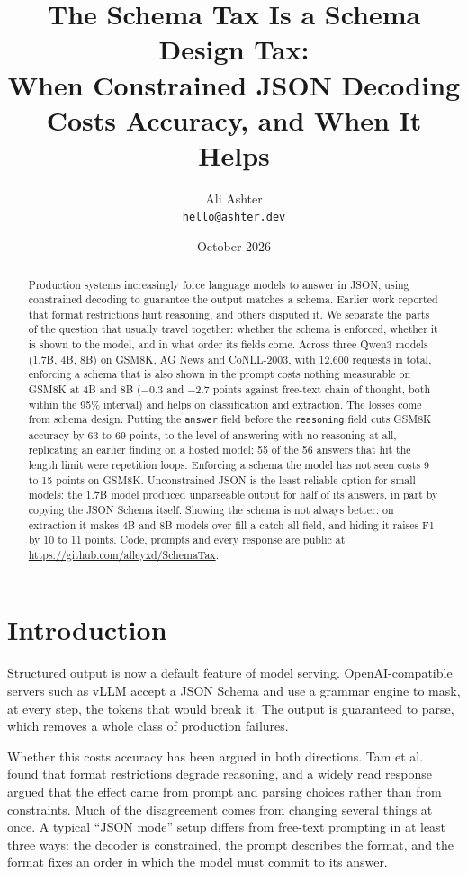 \documentclass[10pt,twocolumn]{article}
\title{The Schema Tax Is a Schema Design Tax:\\When Constrained JSON Decoding Costs Accuracy, and When It Helps}
\author{Ali Ashter\\\texttt{hello@ashter.dev}}
\date{October 2026}
\begin{document}
\maketitle

\begin{abstract}
Production systems increasingly force language models to answer in JSON, using constrained decoding to guarantee the
output matches a schema. Earlier work reported that format restrictions hurt reasoning, and others disputed it. We
separate the parts of the question that usually travel together: whether the schema is enforced, whether it is shown
to the model, and in what order its fields come. Across three Qwen3 models (1.7B, 4B, 8B) on GSM8K, AG News and
CoNLL-2003, with 12,600 requests in total, enforcing a schema that is also shown in the prompt costs nothing
measurable on GSM8K at 4B and 8B ($-0.3$ and $-2.7$ points against free-text chain of thought, both within the 95\%
interval) and helps on classification and extraction. The losses come from schema design. Putting the
\texttt{answer} field before the \texttt{reasoning} field cuts GSM8K accuracy by 63 to 69 points, to the level of
answering with no reasoning at all, replicating an earlier finding on a hosted model; 55 of the 56 answers that hit
the length limit were repetition loops. Enforcing a schema the model has not
seen costs 9 to 15 points on GSM8K. Unconstrained JSON is the least reliable option for small models: the 1.7B model
produced unparseable output for half of its answers, in part by copying the JSON Schema itself. Showing the schema is
not always better: on extraction it makes 4B and 8B models over-fill a catch-all field, and hiding it raises F1 by
10 to 11 points. Code, prompts and every response are public at \url{https://github.com/alleyxd/SchemaTax}.
\end{abstract}

\section{Introduction}

Structured output is now a default feature of model serving. OpenAI-compatible servers such as vLLM \cite{vllm} accept
a JSON Schema and use a grammar engine \cite{outlines,xgrammar} to mask, at every step, the tokens that would break it.
The output is guaranteed to parse, which removes a whole class of production failures.

Whether this costs accuracy has been argued in both directions. Tam et al.\ \cite{speakfreely} found that format
restrictions degrade reasoning, and a widely read response \cite{saywhat} argued that the effect came from prompt and
parsing choices rather than from constraints. Much of the disagreement comes from changing several things at once.
A typical ``JSON mode'' setup differs from free-text prompting in at least three ways: the decoder is constrained,
the prompt describes the format, and the format fixes an order in which the model must commit to its answer.
\end{document}
